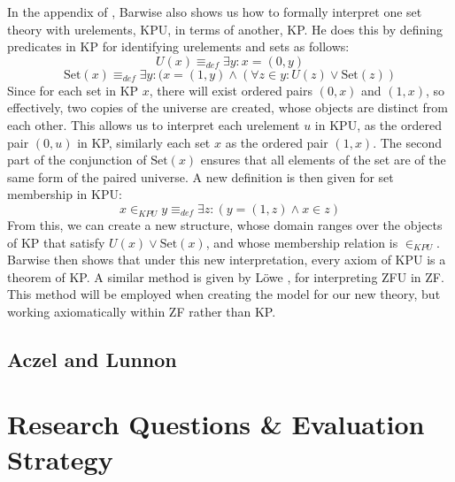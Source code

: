 \documentclass[11pt]{report}
\theoremstyle{definition}
\theoremstyle{theorem}
\theoremstyle{lemma}
\begin{document}
In the appendix of \cite{barwise}, Barwise also shows us how to formally interpret one set theory with urelements, KPU, in terms of another, KP.
He does this by defining predicates in KP for identifying urelements and sets as follows:
$$U(x) \equiv_{def} \exists y: x = (0,y)$$
$$\text{Set}(x) \equiv_{def} \exists y:(x = (1,y) \wedge (\forall z\in y: U(z) \vee \text{Set}(z))$$
Since for each set in KP $x$, there will exist ordered pairs $(0,x)$ and $(1,x)$, so effectively, two copies of the universe are created, whose objects are distinct from each other.
This allows us to interpret each urelement $u$ in KPU, as the ordered pair $(0,u)$ in KP, similarly each set $x$ as the ordered pair $(1,x)$.
The second part of the conjunction of $\text{Set}(x)$ ensures that all elements of the set are of the same form of the paired universe.
A new definition is then given for set membership in KPU:
$$x\in_{KPU} y \equiv_{def} \exists z: (y=(1,z) \wedge x\in z)$$
From this, we can create a new structure, whose domain ranges over the objects of KP that satisfy $U(x) \vee \text{Set}(x)$, and whose membership relation is $\in_{KPU}$.
Barwise then shows that under this new interpretation, every axiom of KPU is a theorem of KP.
A similar method is given by L\"owe \cite{lowe}, for interpreting ZFU in ZF.
This method will be employed when creating the model for our new theory, but working axiomatically within ZF rather than KP.

\section{Aczel and Lunnon}

\chapter{Research Questions \& Evaluation Strategy}
\end{document}
